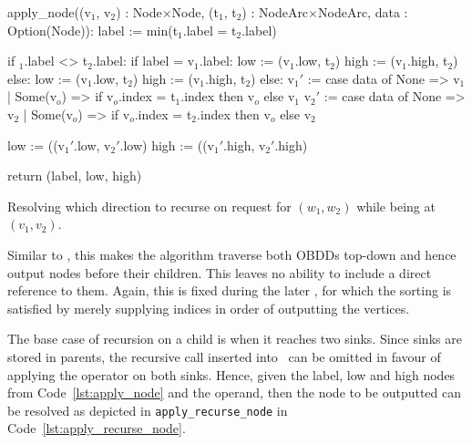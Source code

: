 \begin{lstfloat}[ht!]
  \centering

  \begin{blstlisting}
  apply_node((v$_1$, v$_2$) : Node$\times$Node,
             (t$_1$, t$_2$) : NodeArc$\times$NodeArc,
             data : Option(Node)):
      label := min(t$_1$.label = t$_2$.label)

      if $_1$.label <> t$_2$.label:
          if label = v$_1$.label:
              low := (v$_1$.low, t$_2$)
              high := (v$_1$.high, t$_2$)
          else:
              low := (v$_1$.low, t$_2$)
              high := (v$_1$.high, t$_2$)
      else:
          v$_1'$ := case data of None => v$_1$
                         | Some(v$_o$) => if v$_o$.index = t$_1$.index
                                     then v$_o$ else v$_1$
          v$_2'$ := case data of None => v$_2$
                         | Some(v$_o$) => if v$_o$.index = t$_2$.index
                                     then v$_o$ else v$_2$

          low := ((v$_1'$.low, v$_2'$.low)
          high := ((v$_1'$.high, v$_2'$.high)

      return (label, low, high)
  \end{blstlisting}

  \caption{Resolving which direction to recurse on request for $(w_1, w_2)$ while
    being at $(v_1, v_2)$.}
  \label{lst:apply_node}
\end{lstfloat}

Similar to \Substitute, this makes the algorithm traverse both OBDDs top-down
and hence output nodes before their children. This leaves no ability to include
a direct reference to them. Again, this is fixed during the later \Reduce, for
which the sorting is satisfied by merely supplying indices in order of
outputting the vertices.

The base case of recursion on a child is when it reaches two sinks. Since sinks
are stored in parents, the recursive call inserted into \ApplyQrec\ can be
omitted in favour of applying the operator on both sinks. Hence, given the
label, low and high nodes from Code~\ref{lst:apply_node} and the operand, then
the node to be outputted can be resolved as depicted in
\lstinline{apply_recurse_node} in Code~\ref{lst:apply_recurse_node}.

